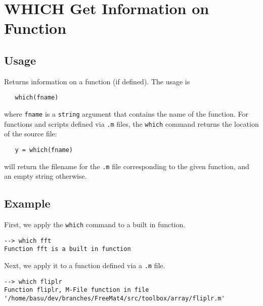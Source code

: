 \section{WHICH Get Information on Function}

\subsection{Usage}

Returns information on a function (if defined).  The usage is
\begin{verbatim}
   which(fname)
\end{verbatim}
where \verb|fname| is a \verb|string| argument that contains the name of the 
function.  For functions and scripts defined
via \verb|.m| files, the \verb|which| command returns the location of the source
file:
\begin{verbatim}
   y = which(fname)
\end{verbatim}
will return the filename for the \verb|.m| file corresponding to the given
function, and an empty string otherwise.
\subsection{Example}

First, we apply the \verb|which| command to a built in function.
\begin{verbatim}
--> which fft
Function fft is a built in function
\end{verbatim}
Next, we apply it to a function defined via a \verb|.m| file.
\begin{verbatim}
--> which fliplr
Function fliplr, M-File function in file '/home/basu/dev/branches/FreeMat4/src/toolbox/array/fliplr.m'
\end{verbatim}

